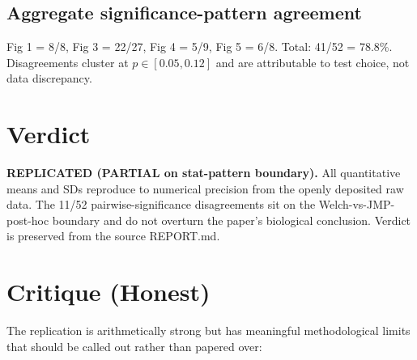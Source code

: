 \documentclass[11pt]{article}
\begin{document}
\subsection{Aggregate significance-pattern agreement}
Fig 1 = 8/8, Fig 3 = 22/27, Fig 4 = 5/9, Fig 5 = 6/8. Total: 41/52 = 78.8\%. Disagreements cluster at
$p \in [0.05, 0.12]$ and are attributable to test choice, not data discrepancy.

\section{Verdict}
\textbf{REPLICATED (PARTIAL on stat-pattern boundary).} All quantitative means and SDs reproduce to
numerical precision from the openly deposited raw data. The 11/52 pairwise-significance disagreements
sit on the Welch-vs-JMP-post-hoc boundary and do not overturn the paper's biological conclusion.
Verdict is preserved from the source REPORT.md.

\section{Critique (Honest)}
The replication is arithmetically strong but has meaningful methodological limits that should be
called out rather than papered over:
\end{document}
